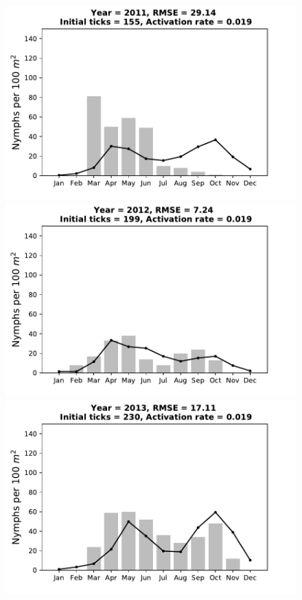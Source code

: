 \documentclass[a4paper, 11pt]{scrartcl}
\begin{document}
\begin{figure}[h!]
\begin{minipage}[c]{0.40\linewidth}
\includegraphics[width=\linewidth]{figures/s5/s5_2011}
\end{minipage}
\begin{minipage}[c]{0.40\linewidth}
\includegraphics[width=\linewidth]{figures/s5/s5_2012}
\end{minipage}
\begin{minipage}[c]{0.40\linewidth}
\includegraphics[width=\linewidth]{figures/s5/s5_2013}

\end{minipage}
\end{figure}
\end{document}
